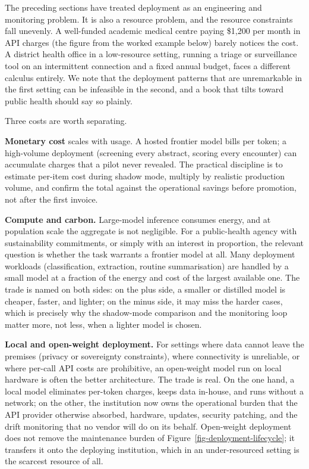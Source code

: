 \documentclass[
  letterpaper,
  11pt]{scrbook}
\begin{document}
The preceding sections have treated deployment as an engineering and
monitoring problem. It is also a resource problem, and the resource
constraints fall unevenly. A well-funded academic medical centre paying
\$1,200 per month in API charges (the figure from the worked example
below) barely notices the cost. A district health office in a
low-resource setting, running a triage or surveillance tool on an
intermittent connection and a fixed annual budget, faces a different
calculus entirely. We note that the deployment patterns that are
unremarkable in the first setting can be infeasible in the second, and a
book that tilts toward public health should say so plainly.

Three costs are worth separating.

\textbf{Monetary cost} scales with usage. A hosted frontier model bills
per token; a high-volume deployment (screening every abstract, scoring
every encounter) can accumulate charges that a pilot never revealed. The
practical discipline is to estimate per-item cost during shadow mode,
multiply by realistic production volume, and confirm the total against
the operational savings before promotion, not after the first invoice.

\textbf{Compute and carbon.} Large-model inference consumes energy, and
at population scale the aggregate is not negligible. For a public-health
agency with sustainability commitments, or simply with an interest in
proportion, the relevant question is whether the task warrants a
frontier model at all. Many deployment workloads (classification,
extraction, routine summarisation) are handled by a small model at a
fraction of the energy and cost of the largest available one. The trade
is named on both sides: on the plus side, a smaller or distilled model
is cheaper, faster, and lighter; on the minus side, it may miss the
harder cases, which is precisely why the shadow-mode comparison and the
monitoring loop matter more, not less, when a lighter model is chosen.

\textbf{Local and open-weight deployment.} For settings where data
cannot leave the premises (privacy or sovereignty constraints), where
connectivity is unreliable, or where per-call API costs are prohibitive,
an open-weight model run on local hardware is often the better
architecture. The trade is real. On the one hand, a local model
eliminates per-token charges, keeps data in-house, and runs without a
network; on the other, the institution now owns the operational burden
that the API provider otherwise absorbed, hardware, updates, security
patching, and the drift monitoring that no vendor will do on its behalf.
Open-weight deployment does not remove the maintenance burden of
Figure~\ref{fig-deployment-lifecycle}; it transfers it onto the
deploying institution, which in an under-resourced setting is the
scarcest resource of all.
\end{document}
